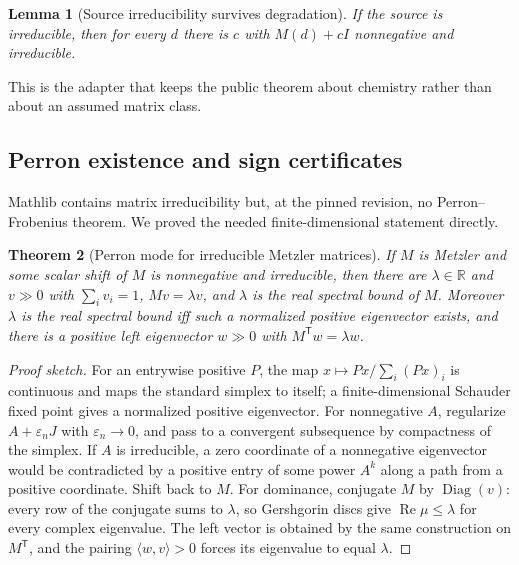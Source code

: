 \documentclass[11pt,a4paper]{article}
\theoremstyle{plain}
\newtheorem{theorem}{Theorem}[section]
\newtheorem{lemma}[theorem]{Lemma}
\theoremstyle{definition}
\theoremstyle{remark}
\newcommand{\R}{\mathbb{R}}
\newcommand{\Diag}{\operatorname{Diag}}
\newcommand{\Tp}{^{\mathsf T}}
\begin{document}
\begin{lemma}[Source irreducibility survives degradation]\label{lem:shift}
If the source is irreducible, then for every $d$ there is $c$ with $M(d)+cI$ nonnegative and irreducible.
\end{lemma}

This is the adapter that keeps the public theorem about chemistry rather than about an assumed matrix class.

\subsection{Perron existence and sign certificates}

Mathlib contains matrix irreducibility but, at the pinned revision, no Perron--Frobenius theorem. We proved the needed finite-dimensional statement directly.

\begin{theorem}[Perron mode for irreducible Metzler matrices]\label{thm:perron}
If $M$ is Metzler and some scalar shift of $M$ is nonnegative and irreducible, then there are $\lambda\in\R$ and $v\gg 0$ with $\sum_i v_i=1$, $Mv=\lambda v$, and $\lambda$ is the real spectral bound of $M$. Moreover $\lambda$ is the real spectral bound iff such a normalized positive eigenvector exists, and there is a positive left eigenvector $w\gg 0$ with $M\Tp w=\lambda w$.
\end{theorem}

\begin{proof}[Proof sketch]
For an entrywise positive $P$, the map $x\mapsto Px/\sum_i(Px)_i$ is continuous and maps the standard simplex to itself; a finite-dimensional Schauder fixed point \cite{schauder1930} gives a normalized positive eigenvector. For nonnegative $A$, regularize $A+\varepsilon_n J$ with $\varepsilon_n\to 0$, and pass to a convergent subsequence by compactness of the simplex. If $A$ is irreducible, a zero coordinate of a nonnegative eigenvector would be contradicted by a positive entry of some power $A^k$ along a path from a positive coordinate. Shift back to $M$. For dominance, conjugate $M$ by $\Diag(v)$: every row of the conjugate sums to $\lambda$, so Gershgorin discs give $\operatorname{Re}\mu\le\lambda$ for every complex eigenvalue. The left vector is obtained by the same construction on $M\Tp$, and the pairing $\langle w,v\rangle>0$ forces its eigenvalue to equal $\lambda$.
\end{proof}
\end{document}
